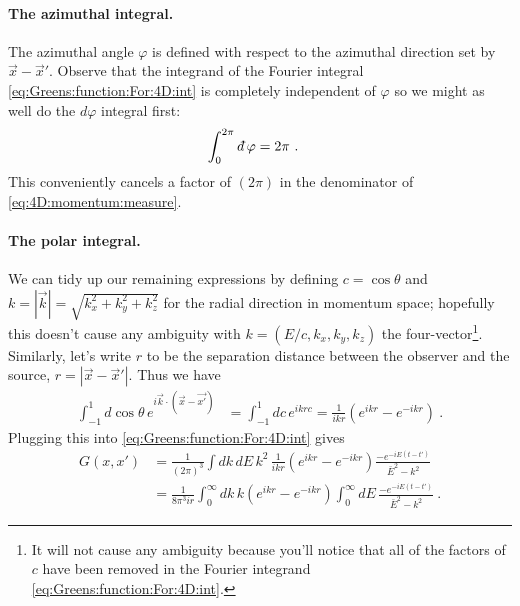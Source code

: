 \paragraph{The azimuthal integral.}
The azimuthal angle $\varphi$ is defined with respect to the azimuthal direction set by $\vec{x}-\vec{x}'$. Observe that the integrand of the Fourier integral \eqref{eq:Greens:function:For:4D:int} is completely independent of $\varphi$ so we might as well do the $d\varphi$ integral first:
\begin{align}
	\int_0^{2\pi} \dbar \varphi &= 2\pi \ .
\end{align}
This conveniently cancels a factor of $(2\pi)$ in the denominator of \eqref{eq:4D:momentum:measure}.

\paragraph{The polar integral.}
We can tidy up our remaining expressions by defining $c=\cos\theta$ and $k = |\vec{k}| = \sqrt{k_x^2 + k_y^2+k_z^2}$ for the radial direction in momentum space; hopefully this doesn't cause any ambiguity with $k = (E/c,k_x,k_y,k_z)$ the four-vector\footnote{It will not cause any ambiguity because you'll notice that all of the factors of $c$ have been removed in the Fourier integrand \eqref{eq:Greens:function:For:4D:int}.}. Similarly, let's write $r$ to be the separation distance between the observer and the source, $r=|\vec{x}-\vec{x}'|$. Thus we have
\begin{align}
	\int_{-1}^1 d\cos\theta \, e^{i\vec{k}\cdot(\vec{x}-\vec{x'})}
	&=
	\int_{-1}^1 dc\, e^{ikrc}
	= 
	\frac{1}{ikr}\left(e^{ikr} - e^{-ikr}\right) \ .
\end{align}
Plugging this into \eqref{eq:Greens:function:For:4D:int} gives
\begin{align}
	G(x,x') &=
	\frac{1}{(2\pi)^3}
	\int dk \, dE \, k^2
	\, 
	\frac{1}{ikr}\left(e^{ikr} - e^{-ikr}\right)
	\frac{- e^{-iE (t-t')}}{\bar{E}^2-k^2}
	\\
	&=
	\frac{1}{8\pi^3 ir}
	\int_0^\infty dk\, 
	k \left(e^{ikr} - e^{-ikr}\right)
	\int_0^\infty dE \, 
	\frac{-e^{-iE (t-t')}}{\bar{E}^2-k^2}
	\ .
\end{align}

